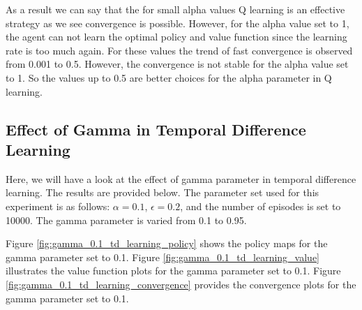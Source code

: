 \documentclass{assignment}
\begin{document}
As a result we can say that the for small alpha values Q learning is an effective strategy as we see convergence is possible. However, for the alpha value set to 1, the agent can not learn the optimal policy and value function since the learning rate is too much again. For these values the trend of fast convergence is observed from 0.001 to 0.5. However, the convergence is not stable for the alpha value set to 1. So the values up to 0.5 are better choices for the alpha parameter in Q learning.


\subsection{Effect of Gamma in Temporal Difference Learning}
Here, we will have a look at the effect of gamma parameter in temporal difference learning. The results are provided below. The parameter set used for this experiment is as follows: $\alpha = 0.1$, $\epsilon = 0.2$, and the number of episodes is set to 10000. The gamma parameter is varied from 0.1 to 0.95.

Figure \ref{fig:gamma_0.1_td_learning_policy} shows the policy maps for the gamma parameter set to 0.1. Figure \ref{fig:gamma_0.1_td_learning_value} illustrates the value function plots for the gamma parameter set to 0.1. Figure \ref{fig:gamma_0.1_td_learning_convergence} provides the convergence plots for the gamma parameter set to 0.1.
\end{document}
